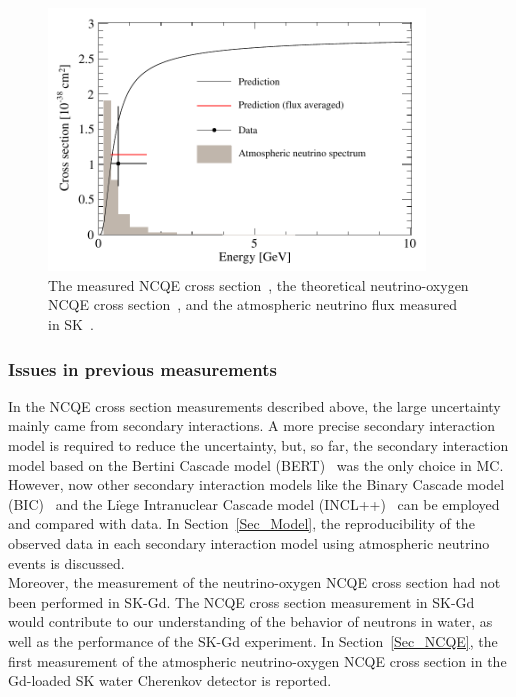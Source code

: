 \begin{figure}[h]
	\centering
	\includegraphics[width=10cm]{Figures/Introduction/Linyan_NCQE}
	\caption[The measured NCQE cross section, the theoretical NCQE cross section, and the atmospheric neutrino flux measured in SK]{
	The measured NCQE cross section~\cite{2019Linyan}, the theoretical neutrino-oxygen NCQE cross section~\cite{2012Ankowski}, and the atmospheric neutrino flux measured in SK~\cite{2016Richard}.
	}\label{Introd_Linyan_NCQE}
\end{figure}

\subsubsection{Issues in previous measurements}
\hs
In the NCQE cross section measurements described above, the large uncertainty mainly came from secondary interactions.
A more precise secondary interaction model is required to reduce the uncertainty, but, so far, the secondary interaction model based on the Bertini Cascade model (BERT)~\cite{2015Wright} was the only choice in MC.
However, now other secondary interaction models like the Binary Cascade model (BIC)~\cite{2004Folger} and the Li$\grave{\text{e}}$ge Intranuclear Cascade model (INCL++)~\cite{2013Boudard} can be employed and compared with data.
In Section~\ref{Sec_Model}, the reproducibility of the observed data in each secondary interaction model using atmospheric neutrino events is discussed.\\
\hs
Moreover, the measurement of the neutrino-oxygen NCQE cross section had not been performed in SK-Gd.
The NCQE cross section measurement in SK-Gd would contribute to our understanding of the behavior of neutrons in water, as well as the performance of the SK-Gd experiment.
In Section~\ref{Sec_NCQE}, the first measurement of the atmospheric neutrino-oxygen NCQE cross section in the Gd-loaded SK water Cherenkov detector is reported.\\










\newpage

